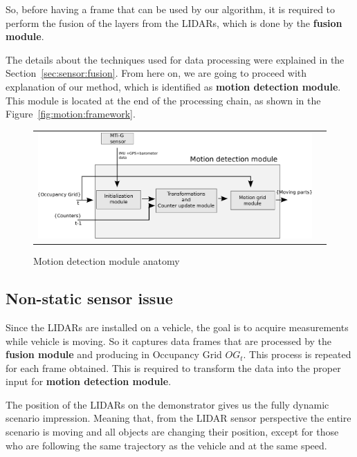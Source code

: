 So, before having a frame that can be used by our algorithm, it is required to perform the fusion of the layers from the LIDARs, which is done by the \textbf{fusion module}. 

The details about the techniques used for data processing were explained in the Section~\ref{sec:sensor:fusion}. From here on, we are going to proceed with explanation of our method, which is identified as \textbf{motion detection module}. This module is located at the end of the processing chain, as shown in the Figure~\ref{fig:motion:framework}. 

\begin{figure}[h]
   \centering
     \begin{tabular}{lr}
       \includegraphics[scale=0.50]{img/fig:motion:framework:motionmodule}
     \end{tabular}
   \caption{Motion detection module anatomy}
   \label{fig:motion:framework:motionmodule}
\end{figure}


\subsection{Non-static sensor issue}

Since the LIDARs are installed on a vehicle, the goal is to acquire measurements while vehicle is moving. So it captures data frames that are processed by the \textbf{fusion module} and producing in Occupancy Grid $OG_t$. This process is repeated for each frame obtained. This is required to transform the data into the proper input for \textbf{motion detection module}.

The position of the LIDARs on the demonstrator gives us the fully dynamic scenario impression. Meaning that, from the LIDAR sensor perspective the entire scenario is moving and all objects are changing their position, except for those who are following the same trajectory as the vehicle and at the same speed. 

